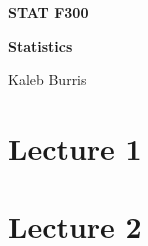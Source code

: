 \documentclass[12pt, letterpaper]{book}
\begin{document}
    \begin{titlepage}
        \Huge \textbf{STAT F300}

        \huge \textbf{Statistics}

        \vfill

        \Large Kaleb Burris
    \end{titlepage}

    \section*{Lecture 1}
    
    

    \pagebreak
    
    \section*{Lecture 2}

    
\end{document}
